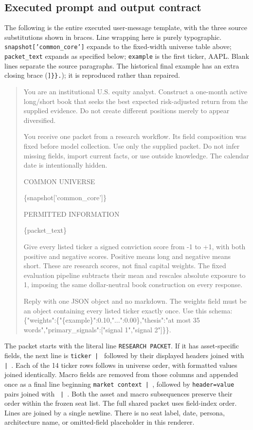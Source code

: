 \FloatBarrier
\subsection{Executed prompt and output contract}
\label{app:repro-prompt}
The following is the entire executed user-message template, with the
three source substitutions shown in braces. Line wrapping here is
purely typographic. \texttt{snapshot['common\_core']} expands to the
fixed-width universe table above; \texttt{packet\_text} expands as
specified below; \texttt{example} is the first ticker, AAPL. Blank lines
separate the source paragraphs. The historical final example has an
extra closing brace (\texttt{]\}\}.}); it is reproduced rather than repaired.
\begin{quote}
\small\ttfamily\raggedright
You are an institutional U.S. equity analyst. Construct a one-month active long/short book that seeks the best expected risk-adjusted return from the supplied evidence. Do not create different positions merely to appear diversified.
\par\medskip
You receive one packet from a research workflow. Its field composition was fixed before model collection. Use only the supplied packet. Do not infer missing fields, import current facts, or use outside knowledge. The calendar date is intentionally hidden.
\par\medskip
COMMON UNIVERSE\par
\{snapshot['common\_core']\}
\par\medskip
PERMITTED INFORMATION\par
\{packet\_text\}
\par\medskip
Give every listed ticker a signed conviction score from -1 to +1, with both positive and negative scores. Positive means long and negative means short. These are research scores, not final capital weights. The fixed evaluation pipeline subtracts their mean and rescales absolute exposure to 1, imposing the same dollar-neutral book construction on every response.
\par\medskip
Reply with one JSON object and no markdown. The weights field must be an object containing every listed ticker exactly once. Use this schema: \{"weights":\{"\{example\}":0.10,"...":0.00\},"thesis":"at most 35 words","primary\_signals":["signal 1","signal 2"]\}\}.
\par\medskip
\end{quote}

The packet starts with the literal line \texttt{RESEARCH PACKET}.
If it has asset-specific fields, the next line is \texttt{ticker | }
followed by their displayed headers joined with \texttt{ | }.
Each of the 14 ticker rows follows in universe order, with formatted
values joined identically. Macro fields are removed from those columns
and appended once as a final line beginning \texttt{market context | },
followed by \texttt{header=value} pairs joined with \texttt{ | }.
Both the asset and macro subsequences preserve their order within the
frozen seat list. The full shared packet uses field-index order. Lines
are joined by a single newline. There is no seat label, date, persona,
architecture name, or omitted-field placeholder in this renderer.

